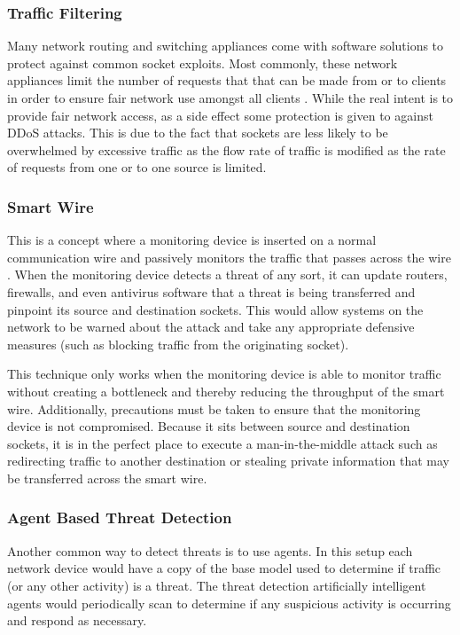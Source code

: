 \documentclass[conference, 12pt]{IEEEtran}
\begin{document}
\subsubsection{Traffic Filtering}
Many network routing and switching appliances come with software solutions to protect against common socket exploits. Most commonly, these network appliances limit the number of requests that that can be made from or to clients in order to ensure fair network use amongst all clients \cite{Herbert}. While the real intent is to provide fair network access, as a side effect some protection is given to against DDoS attacks. This is due to the fact that sockets are less likely to be overwhelmed by excessive traffic as the flow rate of traffic is modified as the rate of requests from one or to one source is limited.

\subsubsection{Smart Wire}
This is a concept where a monitoring device is inserted on a normal communication wire and passively monitors the traffic that passes across the wire \cite{Herbert}. When the monitoring device detects a threat of any sort, it can update routers, firewalls, and even antivirus software that a threat is being transferred and pinpoint its source and destination sockets. This would allow systems on the network to be warned about the attack and take any appropriate defensive measures (such as blocking traffic from the originating socket).

This technique only works when the monitoring device is able to monitor traffic without creating a bottleneck and thereby reducing the throughput of the smart wire. Additionally, precautions must be taken to ensure that the monitoring device is not compromised. Because it sits between source and destination sockets, it is in the perfect place to execute a man-in-the-middle attack such as redirecting traffic to another destination or stealing private information that may be transferred across the smart wire.

\subsubsection{Agent Based Threat Detection}
Another common way to detect threats is to use agents. In this setup each network device would have a copy of the base model used to determine if traffic (or any other activity) is a threat. The threat detection artificially intelligent agents would periodically scan to determine if any suspicious activity is occurring and respond as necessary.
\end{document}
